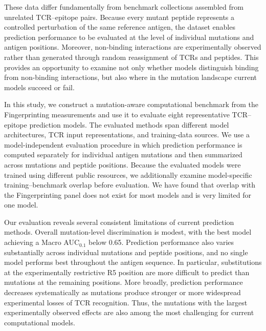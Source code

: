\documentclass{article}
\begin{document}
These data differ fundamentally from benchmark collections assembled from
unrelated TCR--epitope pairs. Because every mutant peptide represents a
controlled perturbation of the same reference antigen, the dataset enables
prediction performance to be evaluated at the level of individual mutations
and antigen positions. Moreover, non-binding interactions are experimentally
observed rather than generated through random reassignment of TCRs and
peptides. This provides an opportunity to examine not only whether models
distinguish binding from non-binding interactions, but also where in the
mutation landscape current models succeed or fail.

In this study, we construct a mutation-aware computational benchmark from
the Fingerprinting measurements and use it to evaluate eight representative
TCR--epitope prediction models. The evaluated methods span different model
architectures, TCR input representations, and training-data sources. We use
a model-independent evaluation procedure in which prediction performance is
computed separately for individual antigen mutations and then summarized
across mutations and peptide positions. Because the evaluated models were
trained using different public resources, we additionally examine
model-specific training--benchmark overlap before evaluation. We have found that overlap with
the Fingerprinting panel does not exist for most models and is very limited for
one model.

Our evaluation reveals several consistent limitations of current prediction
methods. Overall mutation-level discrimination is modest, with the best
model achieving a Macro AUC$_{0.1}$ below 0.65. Prediction performance also
varies substantially across individual mutations and peptide positions, and
no single model performs best throughout the antigen sequence. In
particular, substitutions at the experimentally restrictive R5 position are
more difficult to predict than mutations at the remaining positions. More
broadly, prediction performance decreases systematically as mutations
produce stronger or more widespread experimental losses of TCR recognition.
Thus, the mutations with the largest experimentally observed effects are
also among the most challenging for current computational models.
\end{document}
